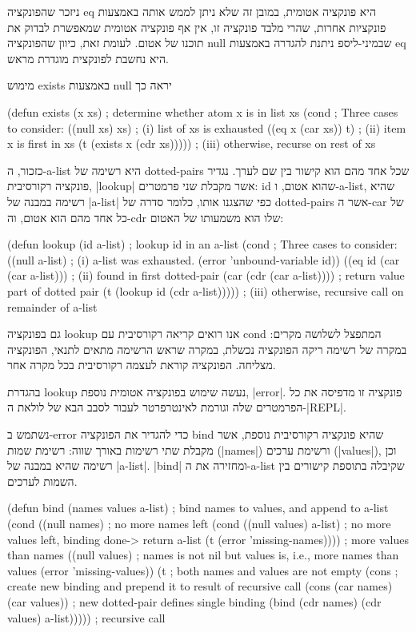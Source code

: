 ניזכר שהפונקציה eq היא פונקציה אטומית, במובן זה שלא ניתן לממש אותה באמצעות
פונקציות אחרות, שהרי מלבד פונקציה זו, אין אף פונקציה אטומית שמאפשרת לבדוק את
תוכנו של אטום. לעומת זאת, כיוון שהפונקציה null שבמיני-ליספ ניתנת להגדרה
באמצעות eq היא נחשבת לפונקצית מוגדרת מראש.

מימוש exists באמצעות null יראה כך
\begin{KERNEL}
(defun exists (x xs) ; determine whether atom x is in list xs
  (cond ; Three cases to consider:
    ((null xs) xs) ; (i) list of xs is exhausted
    ((eq x (car xs)) t) ; (ii) item x is first in xs
    (t (exists x (cdr xs))))) ; (iii) otherwise, recurse on rest of xs
\end{KERNEL}

כזכור, ה-a-list היא רשימה של dotted-pairs שכל אחד מהם הוא קישור בין שם לערך.
נגדיר פונקציה רקורסיבית, \E|lookup| אשר מקבלת שני פרמטרים: id שהוא אטום,
ו-a-list, שהיא רשימה במבנה של \E|a-list| כפי שהצגנו אותו, כלומר סדרה של
dotted-pairs אשר ה-car של כל אחד מהם הוא אטום, וה-cdr שלו הוא משמעותו של האטום:
\begin{KERNEL}
(defun lookup (id a-list) ; lookup id in an a-list
  (cond ; Three cases to consider:
    ((null a-list) ; (i) a-list was exhausted.
      (error 'unbound-variable id))
    ((eq id (car (car a-list))) ; (ii) found in first dotted-pair
      (car (cdr (car a-list)))) ; return value part of dotted pair
    (t (lookup id (cdr a-list))))) ; (iii) otherwise, recursive call on remainder of a-list
\end{KERNEL}
גם בפונקציה lookup אנו רואים קריאה רקורסיבית עם cond המתפצל לשלושה מקרים: במקרה
של רשימה ריקה הפונקציה נכשלת, במקרה שראש הרשימה מתאים לתנאי, הפונקציה מצליחה.
הפונקציה קוראת לעצמה רקורסיבית בכל מקרה אחר.

בהגדרת lookup נעשה שימוש בפונקציה אטומית נוספת, \E|error|. פונקציה זו
מדפיסה את כל הפרמטרים שלה וגורמת לאינטרפרטר לעבור לסבב הבא של לולאת ה-\E|REPL|.

נשתמש ב-error כדי להגדיר את הפונקציה bind שהיא פונקציה רקורסיבית נוספת, אשר
מקבלת שתי רשימות באורך שווה: רשימת שמות (\E|names|) ורשימת ערכים (\E|values|),
וכן רשימה שהיא במבנה של \E|a-list|. \E|bind| ומחזירה את ה-a-list
שקיבלה בתוספת קישורים בין השמות לערכים.

\begin{KERNEL}
(defun bind (names values a-list) ; bind names to values, and append to a-list
  (cond ((null names) ; no more names left
        (cond ((null values) a-list) ; no more values left, binding done-> return a-list
              (t (error 'missing-names)))) ; more values than names
        ((null values) ; names is not nil but values is, i.e., more names than values
          (error 'missing-values))
        (t ; both names and values are not empty
          (cons ; create new binding and prepend it to result of recursive call
            (cons (car names) (car values)) ; new dotted-pair defines single binding
            (bind (cdr names) (cdr values) a-list))))) ; recursive call
\end{KERNEL}

